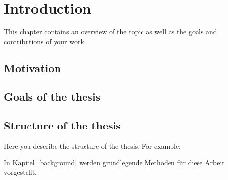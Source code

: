 
\chapter{Introduction}\label{intro}

This chapter contains an overview of the topic as well as the goals and contributions of your work.

\section{Motivation}

\section{Goals of the thesis}

\section{Structure of the thesis}
Here you describe the structure of the thesis. For example:

In Kapitel~\ref{background} werden grundlegende Methoden für diese Arbeit vorgestellt.